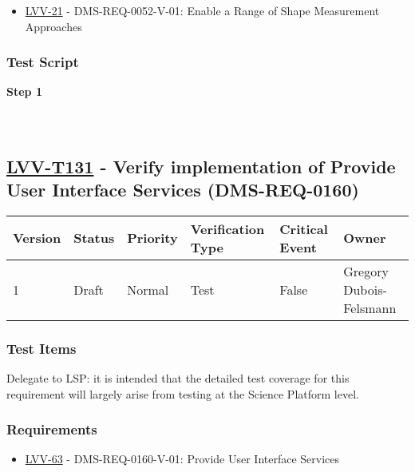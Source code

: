 \begin{itemize}
\tightlist
\item
  \href{https://jira.lsstcorp.org/browse/LVV-21}{LVV-21} -
  DMS-REQ-0052-V-01: Enable a Range of Shape Measurement Approaches
\end{itemize}

\hypertarget{test-script-107}{%
\subsubsection{Test Script}\label{test-script-107}}

\textbf{Step 1}\\
~\\
~\\

\hypertarget{lvv-t131---verify-implementation-of-provide-user-interface-services-dms-req-0160}{%
\subsection{\texorpdfstring{\href{https://jira.lsstcorp.org/secure/Tests.jspa\#/testCase/LVV-T131}{LVV-T131}
- Verify implementation of Provide User Interface Services
(DMS-REQ-0160)}{LVV-T131 - Verify implementation of Provide User Interface Services (DMS-REQ-0160)}}\label{lvv-t131---verify-implementation-of-provide-user-interface-services-dms-req-0160}}

\begin{longtable}[]{@{}llllll@{}}
\toprule
Version & Status & Priority & Verification Type & Critical Event &
Owner\tabularnewline
\midrule
\endhead
1 & Draft & Normal & Test & False & Gregory
Dubois-Felsmann\tabularnewline
\bottomrule
\end{longtable}

\hypertarget{test-items-107}{%
\subsubsection{Test Items}\label{test-items-107}}

Delegate to LSP: it is intended that the detailed test coverage for this
requirement will largely arise from testing at the Science Platform
level.

\hypertarget{requirements-108}{%
\subsubsection{Requirements}\label{requirements-108}}

\begin{itemize}
\tightlist
\item
  \href{https://jira.lsstcorp.org/browse/LVV-63}{LVV-63} -
  DMS-REQ-0160-V-01: Provide User Interface Services
\end{itemize}

